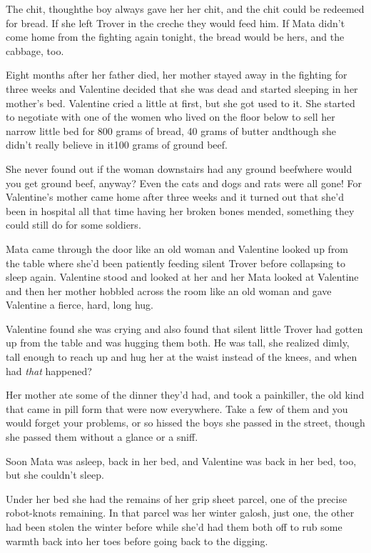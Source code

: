 The chit, though\dash{}the boy always gave her her chit, and the chit
could be redeemed for bread. If she left Trover in the creche they
would feed him. If Mata didn’t come home from the fighting again
tonight, the bread would be hers, and the cabbage, too.

\tb

Eight months after her father died, her mother stayed away in the
fighting for three weeks and Valentine decided that she was dead
and started sleeping in her mother’s bed. Valentine cried a little
at first, but she got used to it. She started to negotiate with one
of the women who lived on the floor below to sell her narrow little
bed for 800 grams of bread, 40 grams of butter and\dash{}though she
didn’t really believe in it\dash{}100 grams of ground beef.

She never found out if the woman downstairs had any ground
beef\dash{}where would you get ground beef, anyway? Even the cats and
dogs and rats were all gone! For Valentine’s mother came home after
three weeks and it turned out that she’d been in hospital all that
time having her broken bones mended, something they could still do
for some soldiers.

Mata came through the door like an old woman and Valentine looked
up from the table where she’d been patiently feeding silent Trover
before collapsing to sleep again. Valentine stood and looked at her
and her Mata looked at Valentine and then her mother hobbled across
the room like an old woman and gave Valentine a fierce, hard, long
hug.

Valentine found she was crying and also found that silent little
Trover had gotten up from the table and was hugging them both. He
was tall, she realized dimly, tall enough to reach up and hug her
at the waist instead of the knees, and when had \emph{that}
happened?

Her mother ate some of the dinner they’d had, and took a
painkiller, the old kind that came in pill form that were now
everywhere. Take a few of them and you would forget your problems,
or so hissed the boys she passed in the street, though she passed
them without a glance or a sniff.

Soon Mata was asleep, back in her bed, and Valentine was back in
her bed, too, but she couldn’t sleep.

Under her bed she had the remains of her grip sheet parcel, one of
the precise robot-knots remaining. In that parcel was her winter
galosh, just one, the other had been stolen the winter before while
she’d had them both off to rub some warmth back into her toes
before going back to the digging.

